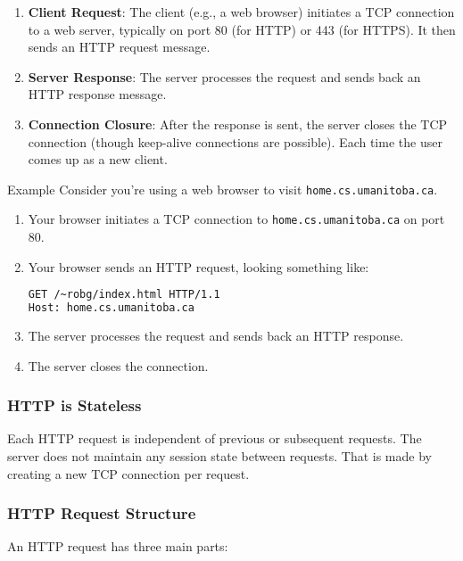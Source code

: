 \begin{enumerate}
    \item \textbf{Client Request}: The client (e.g., a web browser) initiates a TCP connection to a web server, typically on port 80 (for HTTP) or 443 (for HTTPS). It then sends an HTTP request message.
    \item \textbf{Server Response}: The server processes the request and sends back an HTTP response message.
    \item \textbf{Connection Closure}: After the response is sent, the server closes the TCP connection (though keep-alive connections are possible). Each time the user comes up as a new client.
\end{enumerate}

\begin{example}{Example}
Consider you're using a web browser to visit \texttt{home.cs.umanitoba.ca}.
\begin{enumerate}[noitemsep]
    \item Your browser initiates a TCP connection to \texttt{home.cs.umanitoba.ca} on port 80.
    \item Your browser sends an HTTP request, looking something like:
    \begin{lstlisting}[language=html,caption=HTTP Request]
GET /~robg/index.html HTTP/1.1
Host: home.cs.umanitoba.ca    	
    \end{lstlisting}
    \item The server processes the request and sends back an HTTP response.
    \item The server closes the connection.
\end{enumerate}
\end{example}



\subsubsection{HTTP is Stateless}

Each HTTP request is independent of previous or subsequent requests. The server does not maintain any session state between requests. That is made by creating a new TCP connection per request.

\subsubsection{HTTP Request Structure}

An HTTP request has three main parts:


